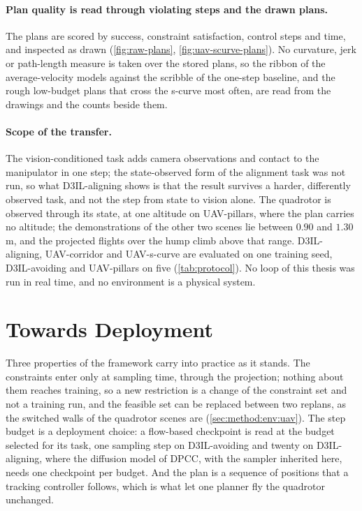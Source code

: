 \paragraph{Plan quality is read through violating steps and the drawn plans.} The plans are scored by
success, constraint satisfaction, control steps and time, and inspected as drawn (\autoref{fig:raw-plans},
\autoref{fig:uav-scurve-plans}). No curvature, jerk or path-length measure is taken over the stored
plans, so the ribbon of the average-velocity models against the scribble of the one-step baseline, and
the rough low-budget plans that cross the s-curve most often, are read from the drawings and the counts
beside them.

\paragraph{Scope of the transfer.} The vision-conditioned task adds camera observations and contact to
the manipulator in one step; the state-observed form of the alignment task was not run, so what
D3IL-aligning shows is that the result survives a harder, differently observed task, and not the step
from state to vision alone. The quadrotor is observed through its state, at one altitude on UAV-pillars,
where the plan carries no altitude; the demonstrations of the other two scenes lie between $0.90$ and
$1.30$\,m, and the projected flights over the hump climb above that range.
D3IL-aligning, UAV-corridor and UAV-s-curve are evaluated on one training seed, D3IL-avoiding and
UAV-pillars on five (\autoref{tab:protocol}). No loop of this thesis was run in real time, and no environment is a physical system.

\section{Towards Deployment}\label{sec:disc:practice}

Three properties of the framework carry into practice as it stands. The constraints enter only at
sampling time, through the projection; nothing about them reaches training, so a new restriction is a
change of the constraint set and not a training run, and the feasible set can be replaced between two
replans, as the switched walls of the quadrotor scenes are (\autoref{sec:method:env:uav}). The step
budget is a deployment choice: a flow-based checkpoint is read at the budget selected for its task,
one sampling step on D3IL-avoiding and twenty on D3IL-aligning, where the diffusion model of
\ac{DPCC}, with the sampler inherited here, needs one checkpoint per budget.
And the plan is a sequence of positions that a tracking controller follows, which is what let one
planner fly the quadrotor unchanged.

